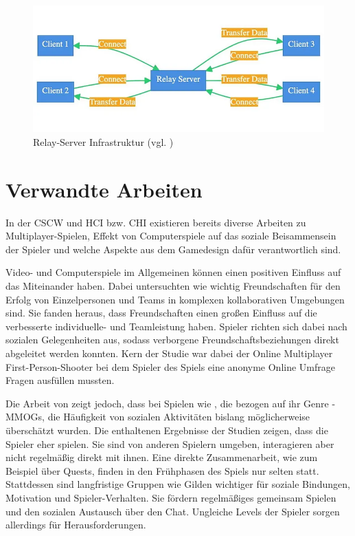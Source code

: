 \begin{figure}[ht]
\centering
\includegraphics[width=1\linewidth]{content/pictures/0_o7LJU1ImxPHIM5Ej.png}
\caption{Relay-Server Infrastruktur (vgl. \cite{mygames_unity_2024})}
\label{fig:relay-server}
\end{figure}


\chapter{Verwandte Arbeiten}
In der \ac{CSCW} und \ac{HCI} bzw. \ac{CHI} existieren bereits diverse Arbeiten zu Multiplayer-Spielen, Effekt von Computerspiele auf das soziale Beisammensein der Spieler und welche Aspekte aus dem Gamedesign dafür verantwortlich sind.

Video- und Computerspiele im Allgemeinen können einen positiven Einfluss auf das Miteinander haben. Dabei untersuchten \cite{mason_friends_2013} wie wichtig Freundschaften für den Erfolg von Einzelpersonen und Teams in komplexen kollaborativen Umgebungen sind. Sie fanden heraus, dass Freundschaften einen großen Einfluss auf die verbesserte individuelle- und Teamleistung haben. Spieler richten sich dabei nach sozialen Gelegenheiten aus, sodass verborgene Freundschaftsbeziehungen direkt abgeleitet werden konnten. Kern der Studie war dabei der Online Multiplayer First-Person-Shooter  bei dem Spieler des Spiels eine anonyme Online Umfrage Fragen ausfüllen mussten. 

Die Arbeit von \cite{ducheneaut_alone_2006} zeigt jedoch, dass bei Spielen wie , die bezogen auf ihr Genre - \ac{MMOG}s, die Häufigkeit von sozialen Aktivitäten bislang möglicherweise überschätzt wurden. Die enthaltenen Ergebnisse der Studien zeigen, dass die Spieler eher  spielen. Sie sind von anderen Spielern umgeben, interagieren aber nicht regelmäßig direkt mit ihnen. Eine direkte Zusammenarbeit, wie zum Beispiel über Quests, finden in den Frühphasen des Spiels nur selten statt. Stattdessen sind langfristige Gruppen wie Gilden wichtiger für soziale Bindungen, Motivation und Spieler-Verhalten. Sie fördern regelmäßiges gemeinsam Spielen und den sozialen Austausch über den Chat. Ungleiche Levels der Spieler sorgen allerdings für Herausforderungen.

